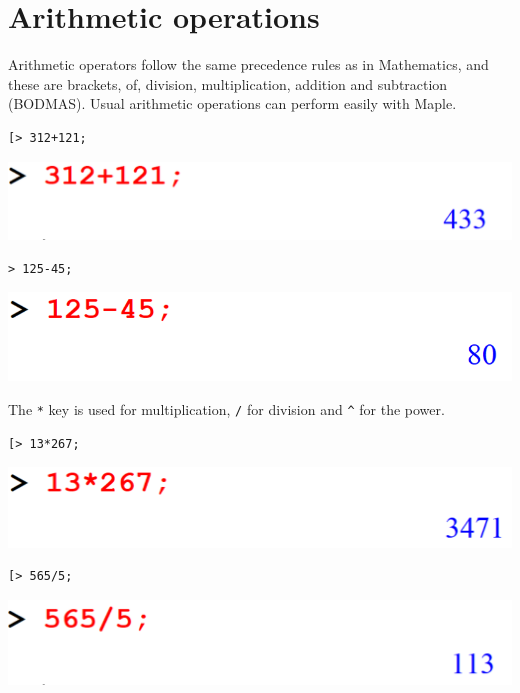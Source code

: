 \documentclass[
]{book}
\theoremstyle{definition}
\theoremstyle{definition}
\theoremstyle{definition}
\theoremstyle{definition}
\theoremstyle{remark}
\begin{document}
\section{Arithmetic operations}\label{arithmetic-operations-1}

Arithmetic operators follow the same precedence rules as in Mathematics, and these are brackets, of, division, multiplication, addition and subtraction (BODMAS). Usual arithmetic operations can perform easily with Maple.

\begin{verbatim}
[> 312+121;
\end{verbatim}

\includegraphics{figures/Lesson 1/fig4.png}

\begin{verbatim}
> 125-45;
\end{verbatim}

\includegraphics{figures/Lesson 1/fig5.png}

The \texttt{*} key is used for multiplication, \texttt{/} for division and \texttt{\^{}} for the power.

\begin{verbatim}
[> 13*267;
\end{verbatim}

\includegraphics{figures/Lesson 1/fig6.png}

\begin{verbatim}
[> 565/5;
\end{verbatim}

\includegraphics{figures/Lesson 1/fig7.png}
\end{document}
